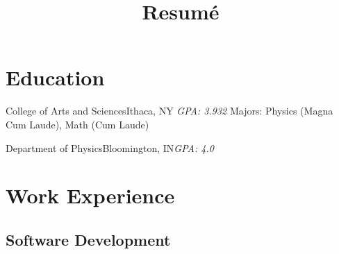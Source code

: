 \documentclass[11pt,a4paper,sans]{moderncv}        %
\title{Resumé}
\begin{document}
\makecvtitle

\section{Education}
{College of Arts and Sciences}{Ithaca, NY}
{\textit{GPA: 3.932}}
{Majors: Physics (Magna Cum Laude), Math (Cum Laude)}

{Department of Physics}{Bloomington, IN}{\textit{GPA: 4.0}}{}


\section{Work Experience}
\subsection{Software Development}
\end{document}
